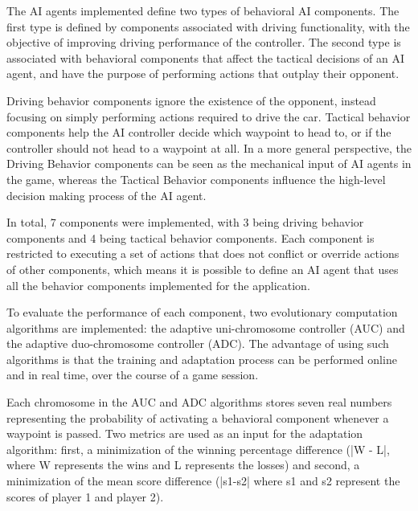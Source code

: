 The AI agents implemented define two types of behavioral AI components. The first type is defined by components associated with driving functionality, with the objective of improving driving performance of the controller. The second type is associated with behavioral components that affect the tactical decisions of an AI agent, and have the purpose of performing actions that outplay their opponent.

Driving behavior components ignore the existence of the opponent, instead focusing on simply performing actions required to drive the car. Tactical behavior components help the AI controller decide which waypoint to head to, or if the controller should not head to a waypoint at all. In a more general perspective, the Driving Behavior components can be seen as the mechanical input of AI agents in the game, whereas the Tactical Behavior components influence the high-level decision making process of the AI agent. 

In total, 7 components were implemented, with 3 being driving behavior components and 4 being tactical behavior components. Each component is restricted to executing a set of actions that does not conflict or override actions of other components, which means it is possible to define an AI agent that uses all the behavior components implemented for the application.

To evaluate the performance of each component, two evolutionary computation algorithms are implemented: the adaptive uni-chromosome controller (AUC) and the adaptive duo-chromosome controller (ADC). The advantage of using such algorithms is that the training and adaptation process can be performed online and in real time, over the course of a game session.

Each chromosome in the AUC and ADC algorithms stores seven real numbers representing the probability of activating a behavioral component whenever a waypoint is passed. Two metrics are used as an input for the adaptation algorithm: first, a minimization of the winning percentage difference (|W - L|, where W represents the wins and L represents the losses) and second, a minimization of the mean score difference (|s1-s2| where s1 and s2 represent the scores of player 1 and player 2).


